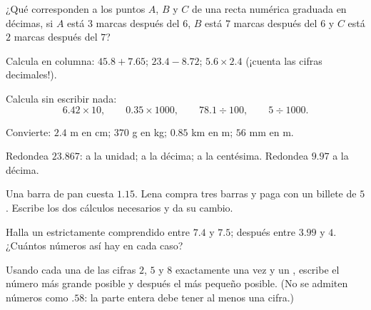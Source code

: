 \begin{exercise}[$\star$]\label{exo:g6:decimals:5}
¿Qué  corresponden a los puntos $A$, $B$ y $C$ de una
recta numérica graduada en décimas, si $A$ está $3$ marcas después del $6$, $B$ está
$7$ marcas después del $6$ y $C$ está $2$ marcas después del $7$?
\end{exercise}

\begin{exercise}[$\star$]\label{exo:g6:decimals:6}
Calcula en columna: $45.8 + 7.65$; \quad $23.4 - 8.72$; \quad
$5.6 \times 2.4$ (¡cuenta las cifras decimales!).
\end{exercise}

\begin{exercise}[$\star$]\label{exo:g6:decimals:7}
Calcula sin escribir nada:
\[
6.42 \times 10, \qquad
0.35 \times 1000, \qquad
78.1 \div 100, \qquad
5 \div 1000 .
\]
\end{exercise}

\begin{exercise}[$\star$]\label{exo:g6:decimals:8}
Convierte: $2.4$ m en cm; \quad $370$ g en kg; \quad $0.85$ km en
m; \quad $56$ mm en m.
\end{exercise}

\begin{exercise}[$\star$]\label{exo:g6:decimals:9}
Redondea $23.867$: a la unidad; a la décima; a la centésima. Redondea
$9.97$ a la décima.
\end{exercise}

\begin{exercise}[$\star\star$]\label{exo:g6:decimals:10}
Una barra de pan cuesta $1.15$. Lena compra tres barras y paga con un billete de
$5$. Escribe los dos cálculos necesarios y da su cambio.
\end{exercise}

\begin{exercise}[$\star\star$]\label{exo:g6:decimals:11}
Halla un  estrictamente comprendido entre $7.4$ y $7.5$; después entre
$3.99$ y $4$. ¿Cuántos números así hay en cada caso?
\end{exercise}

\begin{exercise}[$\star\star\star$]\label{exo:g6:decimals:12}
Usando cada una de las cifras $2$, $5$ y $8$ exactamente una vez y un , escribe el número más grande posible y después el más pequeño
posible. (No se admiten números como $.58$: la parte entera debe tener
al menos una cifra.)
\end{exercise}

